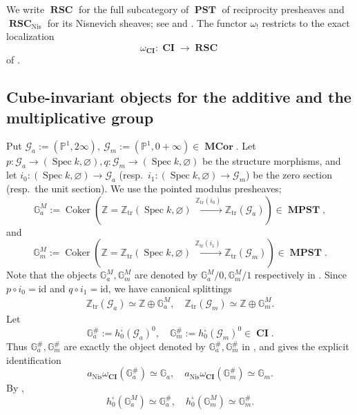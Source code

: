 \documentclass[a4paper,12pt,reqno]{amsart}
\numberwithin{equation}{section}
\theoremstyle{definition}
\newcommand{\Z}{\mathbb{Z}}
\newcommand{\bP}{\mathbb{P}}
\DeclareMathOperator{\Coker}{Coker}
\DeclareMathOperator{\Spec}{Spec}
\newcommand{\Gm}{\mathbb{G}_{m}}
\newcommand{\Ga}{\mathbb{G}_{a}}
\newcommand{\Id}{\mathrm{id}}
\newcommand{\bcube}{{\overline{\square}}}
\newcommand{\RSC}{{\operatorname{\mathbf{RSC}}}}
\newcommand{\CI}{\operatorname{\mathbf{CI}}}
\newcommand{\MPST}{\operatorname{\mathbf{MPST}}}
\newcommand{\PST}{\operatorname{\mathbf{PST}}}
\newcommand{\MCor}{\operatorname{\mathbf{MCor}}}
\newcommand{\Ztr}{\Z_{\mathrm{tr}}}
\newcommand{\GaMod}{\mathbb{G}_{a}^{M}}
\newcommand{\GmMod}{\mathbb G_m^M}
\newcommand{\GaSharp}{\mathbb{G}_{a}^{\#}}
\newcommand{\GmSharp}{\mathbb G_m^{\#}}
\newcommand{\Nis}{\mathrm{Nis}}
\newcommand{\Gapair}{\mathcal{G}_a}
\newcommand{\Gmpair}{\mathcal{G}_m}
\begin{document}
We write $\RSC$ for the full subcategory of $\PST$ of reciprocity
presheaves and $\RSC_{\Nis}$ for its Nisnevich sheaves; see
\cite[Definition~5.7]{HS25} and \cite[Section~3.10]{RSY22}.
The functor $\omega_!$ restricts to the exact localization
\begin{equation}\label{eq:omCI}
 \omega_{\CI}:\CI\to\RSC
\end{equation}
of \cite[Section~3.11, Equation~(3.11.1)]{RSY22}.


\subsection{Cube-invariant objects for the additive and the multiplicative group}
Put
$\Gapair :=(\bP^1,2\infty),\ \Gmpair:=(\bP^1,0+\infty)\in \MCor$.
Let $p:\Gapair \to(\Spec k,\varnothing), q:\Gmpair \to(\Spec k,\varnothing)$ be the structure morphisms, and let
$i_0:(\Spec k,\varnothing)\to\Gapair$ (resp.~$i_1:(\Spec k,\varnothing)\to\Gmpair$) be the zero section (resp.~the unit section).  
We use the pointed modulus presheaves;
\begin{equation}\label{eq:GaM0}
 \GaMod
 :=\Coker\left(
 \Z=\Ztr(\Spec k,\varnothing)
 \xrightarrow{\,\Ztr(i_0)\,}
 \Ztr(\Gapair)
 \right)\in\MPST, 
\end{equation}
and 
\begin{equation}\label{eq:GmM0}
 \GmMod
 :=\Coker\left(
 \Z=\Ztr(\Spec k,\varnothing)
 \xrightarrow{\,\Ztr(i_1)\,}
 \Ztr(\Gmpair)
 \right)\in\MPST.
\end{equation}
Note that the objects $\GaMod, \GmMod$ are denoted by $\GaMod/0, \GmMod/1$ respectively in \cite[Proposition~5.6 and Theorem~5.14]{RSY22}.
Since
$p\circ i_0=\Id$ and $q\circ i_1=\Id$, we have canonical splittings
\begin{align}\label{eq:splitGaGmMod}
    \Ztr(\Gapair)\simeq \Z\oplus \GaMod,\quad 
    \Ztr(\Gmpair)\simeq \Z\oplus \GmMod.
\end{align}
Let
\begin{equation}\label{eq:GaObj}
  \GaSharp:=h_0^{\bcube}(\Gapair)^0,\quad \GmSharp:=h_0^{\bcube}(\Gmpair)^0\in\CI.
\end{equation}
Thus $\GaSharp, \GmSharp$ are exactly the object denoted by
$\mathbb G_a^{\#}, \GmSharp$ in \cite[Section~5.1]{RSY22}, and
\cite[Equation~(5.1.2)]{RSY22} gives the explicit identification
$$ 
a_{\Nis}\omega_{\CI}(\GaSharp)\simeq\Ga,\quad a_{\Nis}\omega_{\CI}(\GmSharp)\simeq\Gm.
$$
By \cite[Section~5.1]{RSY22},
$$h_0^{\bcube}(\GaMod)\simeq\GaSharp,\quad
h_0^{\bcube}(\GmMod)\simeq\GmSharp.
$$
\end{document}
